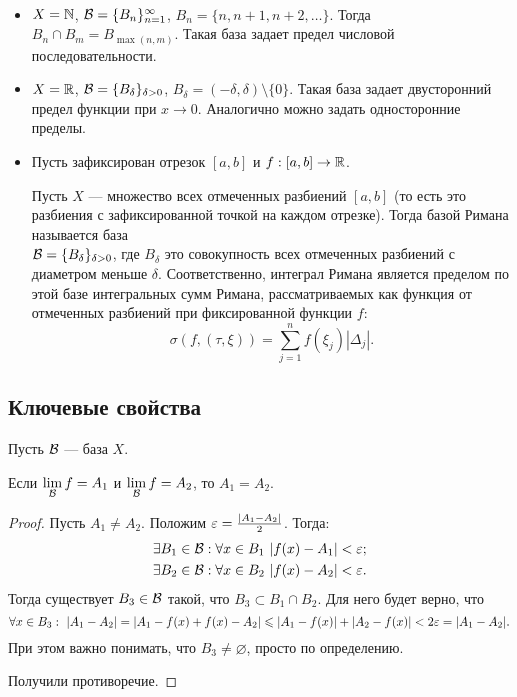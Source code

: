 \documentclass[a4paper, 12pt]{article}
\begin{document}
\begin{Examples}\ 
\begin{itemize}
\item $X = \mathbb{N}$, $\mathcal{B} = \{B_n\}_{n=1}^{\infty}$, $B_n = \{n, n+1, n+2, \ldots  \}$. Тогда $B_n \cap B_m = B_{\max(n, m)}$. Такая база задает предел числовой последовательности.
\item $X = \mathbb{R}$, $\mathcal{B} = \{B_\delta\}_{\delta>0}$, $B_\delta = (-\delta, \delta)\setminus \{0\}$. Такая база задает двусторонний предел функции при $x\to 0$. Аналогично можно задать односторонние пределы.
\item Пусть зафиксирован отрезок $[a, b]$ и $f:[a, b] \to \mathbb{R}$.

Пусть $X$ --- множество всех отмеченных разбиений $[a, b]$ (то есть это разбиения с зафиксированной точкой на каждом отрезке). Тогда базой Римана называется база\\ $\mathcal{B} = \{B_\delta\}_{\delta>0}$, где $B_\delta$ это совокупность всех отмеченных разбиений с диаметром меньше $\delta$. Соответственно, интеграл Римана является пределом по 
этой базе интегральных сумм Римана, рассматриваемых как функция от отмеченных разбиений при фиксированной функции $f$:
$$
\sigma(f, (\tau, \xi)) = \sum\limits_{j=1}^{n}f(\xi_j)|\Delta_j|.
$$
\end{itemize}
\end{Examples}

\subsection{Ключевые свойства}
Пусть $\mathcal{B}$ --- база $X$.

\begin{Statement}
Если $\lim\limits_{\mathcal{B}} f = A_1$ и $\lim\limits_{\mathcal{B}} f = A_2$, то $A_1 = A_2$.
\end{Statement}
\begin{proof}
Пусть $A_1 \neq A_2$. Положим $\varepsilon = \frac{|A_1 - A_2|}{2}$. Тогда:
\begin{align*}
& \exists B_1 \in \mathcal{B}: \forall x \in B_1\ |f(x) - A_1| < \varepsilon; \\
& \exists B_2 \in \mathcal{B}: \forall x \in B_2\ |f(x) - A_2| < \varepsilon.
\end{align*}
Тогда существует $B_3 \in \mathcal{B}$ такой, что $B_3 \subset B_1 \cap B_2$. Для него будет верно, что
$$
\forall x \in B_3:\ |A_1 - A_2| = |A_1 - f(x) + f(x) - A_2| \leqslant |A_1 - f(x)| + |A_2 - f(x)| < 2\varepsilon = |A_1 - A_2|.
$$
При этом важно понимать, что $B_3 \neq \varnothing$, просто по определению.

Получили противоречие.
\end{proof}
\end{document}
